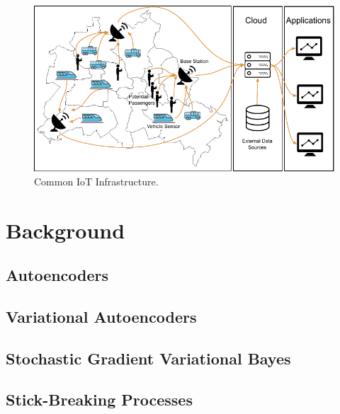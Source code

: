 \begin{figure}[h]
  \centering
  \includegraphics[width=\linewidth]{figs/iot_scenario}
  \caption{Common IoT Infrastructure.}
  \label{fig:iot-app-scenario}
\end{figure}
\section{Background}
\label{sec:background}
% 
% 


\subsection{Autoencoders}


\subsection{Variational Autoencoders}

\subsection{Stochastic Gradient Variational Bayes}

\subsection{Stick-Breaking Processes}